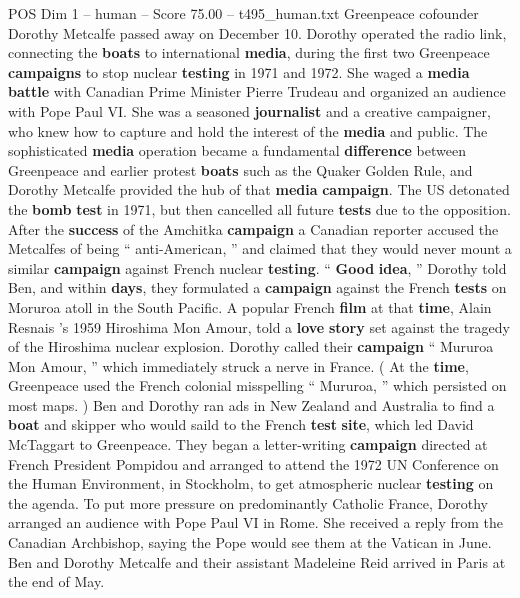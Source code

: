 \begin{textsample}{POS Dim 1 – human – Score 75.00 – t495\_human.txt}  \label{ex:f1_pos_020}
Greenpeace cofounder Dorothy Metcalfe passed away on December 10.
Dorothy operated the radio link, connecting the \textbf{boats} to international \textbf{media}, during the first two Greenpeace \textbf{campaigns} to stop nuclear \textbf{testing} in 1971 and 1972.
She waged a \textbf{media} \textbf{battle} with Canadian Prime Minister Pierre Trudeau and organized an audience with Pope Paul VI.
She was a seasoned \textbf{journalist} and a creative campaigner, who knew how to capture and hold the interest of the \textbf{media} and public.
The sophisticated \textbf{media} operation became a fundamental \textbf{difference} between Greenpeace and earlier protest \textbf{boats} such as the Quaker Golden Rule, and Dorothy Metcalfe provided the hub of that \textbf{media} \textbf{campaign}.
The US detonated the \textbf{bomb} \textbf{test} in 1971, but then cancelled all future \textbf{tests} due to the opposition.
After the \textbf{success} of the Amchitka \textbf{campaign} a Canadian reporter accused the Metcalfes of being “ anti-American, ” and claimed that they would never mount a similar \textbf{campaign} against French nuclear \textbf{testing}. “ \textbf{Good} \textbf{idea}, ” Dorothy told Ben, and within \textbf{days}, they formulated a \textbf{campaign} against the French \textbf{tests} on Moruroa atoll in the South Pacific.
A popular French \textbf{film} at that \textbf{time}, Alain Resnais ’s 1959 Hiroshima Mon Amour, told a \textbf{love} \textbf{story} set against the tragedy of the Hiroshima nuclear explosion.
Dorothy called their \textbf{campaign} “ Mururoa Mon Amour, ” which immediately struck a nerve in France. ( At the \textbf{time}, Greenpeace used the French colonial misspelling “ Mururoa, ” which persisted on most maps. ) Ben and Dorothy ran ads in New Zealand and Australia to find a \textbf{boat} and skipper who would saild to the French \textbf{test} \textbf{site}, which led David McTaggart to Greenpeace.
They began a letter-writing \textbf{campaign} directed at French President Pompidou and arranged to attend the 1972 UN Conference on the Human Environment, in Stockholm, to get atmospheric nuclear \textbf{testing} on the agenda.
To put more pressure on predominantly Catholic France, Dorothy arranged an audience with Pope Paul VI in Rome.
She received a reply from the Canadian Archbishop, saying the Pope would see them at the Vatican in June.
Ben and Dorothy Metcalfe and their assistant Madeleine Reid arrived in Paris at the end of May.

\end{textsample}
